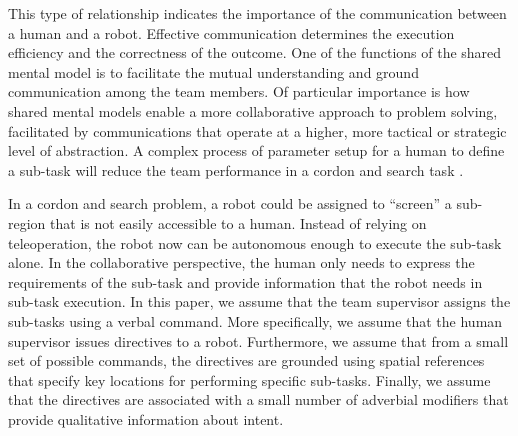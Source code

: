 This type of relationship indicates the importance of the communication between a human and a robot.
Effective communication determines the execution efficiency and the correctness of the outcome.
One of the functions of the shared mental model is to facilitate the mutual understanding and ground communication among the team members.
Of particular importance is how shared mental models enable a more collaborative approach to problem solving, facilitated by communications that operate at a higher, more tactical or strategic level of abstraction.  
A complex process of parameter setup for a human to define a sub-task will reduce the team performance in a cordon and search task \cite{goodrich2013toward}.

In a cordon and search problem, a robot could be assigned to ``screen'' a sub-region that is not easily accessible to a human.
Instead of relying on teleoperation, the robot now can be autonomous enough to execute the sub-task alone.
In the collaborative perspective, the human only needs to express the requirements of the sub-task and provide information that the robot needs in sub-task execution.
In this paper, we assume that the team supervisor assigns the sub-tasks using a verbal command.
More specifically, we assume that the human supervisor issues directives to a robot.
Furthermore, we assume that from a small set of possible commands, the directives are grounded using spatial references that specify key locations for performing specific sub-tasks.
Finally, we assume that the directives are associated with a small number of adverbial modifiers that provide qualitative information about intent.

